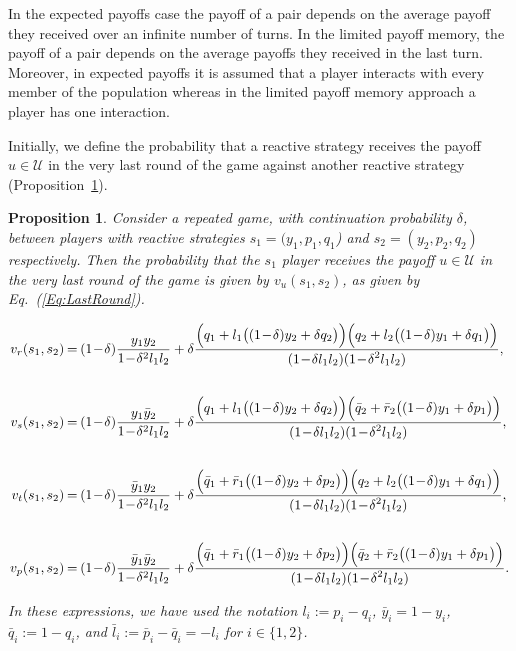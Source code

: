 \documentclass[11pt]{article}
\theoremstyle{plainCl1}
\newtheorem{Prop}{Proposition}
\theoremstyle{plainCl2}
\begin{document}
In the expected payoffs case the payoff of a pair depends on the average payoff
they received over an infinite number of turns. In the limited payoff memory,
the payoff of a pair depends on the average payoffs they received in the last
turn. Moreover, in expected payoffs it is assumed that a player interacts with
every member of the population whereas in the limited payoff memory approach a
player has one interaction.

Initially, we define the probability that a reactive strategy receives the
payoff $u\!\in\! \mathcal{U}$ in the very last round of the game against another
reactive strategy (Proposition~\ref{proposition:last_round}).

\begin{Prop}\label{proposition:last_round} Consider a repeated game, with
    continuation probability $\delta$, between players with reactive strategies
    $s_1\!=\!(y_1, p_1, q_1$)  and $s_2\!=\!(y_2,p_2,q_2)$ respectively. Then
    the probability that the $s_1$ player receives the payoff $u\!\in\!
    \mathcal{U}$ in the very last round of the game is given by
    $v_{u}(s_1,s_2)$, as given by Eq.~(\ref{Eq:LastRound}).

    \begin{equation} \label{Eq:LastRound}
      \setlength{\arraycolsep}{1pt}
      \begin{array}{rcl}
    
      v_{r}(s_1,s_2) &= &\displaystyle (1\!-\!\delta)\frac{y_1y_2}{1\!-\!\delta^2 l_1 l_2}+\delta \frac{\Big(q_1+l_1\big((1\!-\!\delta)y_2+\delta q_2\big)\Big) \Big(q_2+l_2\big((1\!-\!\delta)y_1+\delta q_1\big)\Big)}
      {\displaystyle(1\!-\!\delta l_1l_2)(1\!-\!\delta^2 l_1 l_2)},\\[1cm]
    
      v_{s}(s_1,s_2) &= &\displaystyle (1\!-\!\delta)\frac{y_1\bar{y}_2}{1\!-\!\delta^2 l_1 l_2}+\delta \frac{\Big(q_1+l_1\big((1\!-\!\delta)y_2+\delta q_2\big)\Big) \Big(\bar{q}_2+\bar{r}_2\big((1\!-\!\delta)y_1+\delta p_1\big)\Big)}
      {\displaystyle(1\!-\!\delta l_1l_2)(1\!-\!\delta^2 l_1 l_2)},\\[1cm]
    
      v_{t}(s_1,s_2) &= &\displaystyle (1\!-\!\delta)\frac{\bar{y}_1y_2}{1\!-\!\delta^2 l_1 l_2}+\delta \frac{\Big(\bar{q}_1+\bar{r}_1\big((1\!-\!\delta)y_2+\delta p_2\big)\Big) \Big(q_2+l_2\big((1\!-\!\delta)y_1+\delta q_1\big)\Big)}
      {\displaystyle(1\!-\!\delta l_1l_2)(1\!-\!\delta^2 l_1 l_2)},\\[1cm]
    
      v_{p}(s_1,s_2) &= &\displaystyle (1\!-\!\delta)\frac{\bar{y}_1\bar{y}_2}{1\!-\!\delta^2 l_1 l_2}+\delta \frac{\Big(\bar{q}_1+\bar{r}_1\big((1\!-\!\delta)y_2+\delta p_2\big)\Big) \Big(\bar{q}_2+\bar{r}_2\big((1\!-\!\delta)y_1+\delta p_1\big)\Big)}
      {\displaystyle(1\!-\!\delta l_1l_2)(1\!-\!\delta^2 l_1 l_2)}.
      \end{array}
    \end{equation}

In these expressions, we have used the notation $l_i:=p_i\!-\!q_i$,
$\bar{y}_i\!=\!1\!-\!y_i$, $\bar{q}_i:=1\!-\!q_i$, and
$\bar{l}_i:=\bar{p}_i\!-\!\bar{q}_i=-l_i$ for $i\!\in\!\{1,2\}$.
\end{Prop}
\end{document}
